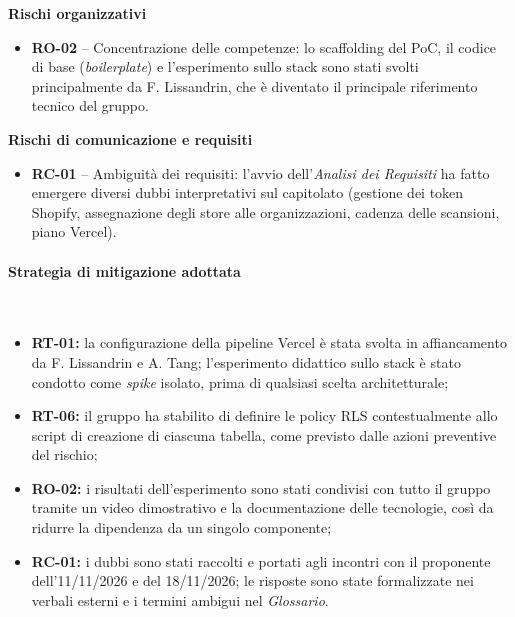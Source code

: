 \noindent\textbf{Rischi organizzativi}
\begin{itemize}
    \item \textbf{RO-02} -- Concentrazione delle competenze: lo scaffolding del PoC, il codice di base (\textit{boilerplate}) e l'esperimento sullo stack sono stati svolti principalmente da F. Lissandrin, che è diventato il principale riferimento tecnico del gruppo.
\end{itemize}

\noindent\textbf{Rischi di comunicazione e requisiti}
\begin{itemize}
    \item \textbf{RC-01} -- Ambiguità dei requisiti: l'avvio dell'\textit{Analisi dei Requisiti} ha fatto emergere diversi dubbi interpretativi sul capitolato (gestione dei token Shopify, assegnazione degli store alle organizzazioni, cadenza delle scansioni, piano Vercel).
\end{itemize}

\paragraph{Strategia di mitigazione adottata}~\\[0.15cm]
\begin{itemize}
    \item \textbf{RT-01:} la configurazione della pipeline Vercel è stata svolta in affiancamento da F. Lissandrin e A. Tang; l'esperimento didattico sullo stack è stato condotto come \textit{spike} isolato, prima di qualsiasi scelta architetturale;
    \item \textbf{RT-06:} il gruppo ha stabilito di definire le policy RLS contestualmente allo script di creazione di ciascuna tabella, come previsto dalle azioni preventive del rischio;
    \item \textbf{RO-02:} i risultati dell'esperimento sono stati condivisi con tutto il gruppo tramite un video dimostrativo e la documentazione delle tecnologie, così da ridurre la dipendenza da un singolo componente;
    \item \textbf{RC-01:} i dubbi sono stati raccolti e portati agli incontri con il proponente dell'11/11/2026 e del 18/11/2026; le risposte sono state formalizzate nei verbali esterni e i termini ambigui nel \textit{Glossario}.
\end{itemize}

